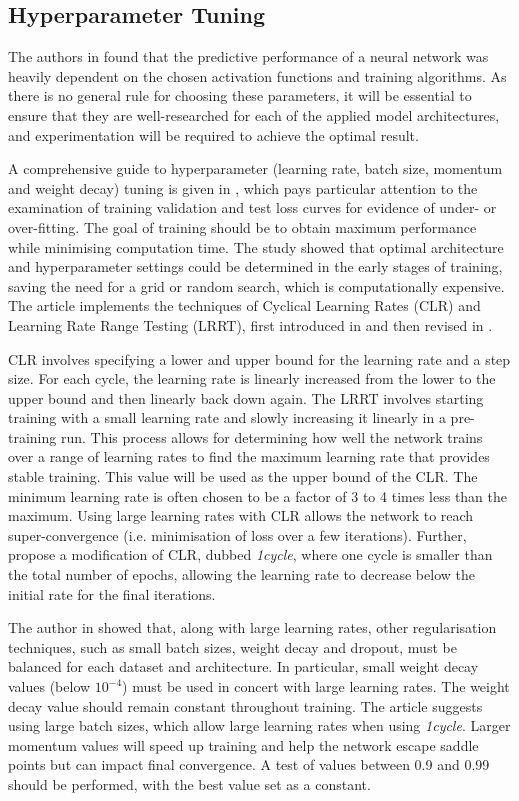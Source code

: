 \documentclass[mstat,12pt]{unswthesis}
\begin{document}
\subsection{Hyperparameter Tuning}
The authors in \cite{Raza2015} found that the predictive performance of a neural network was heavily dependent on the chosen activation functions and training algorithms. As there is no general rule for choosing these parameters, it will be essential to ensure that they are well-researched for each of the applied model architectures, and experimentation will be required to achieve the optimal result.

A comprehensive guide to hyperparameter (learning rate, batch size, momentum and weight decay) tuning is given in \cite{Smith2018}, which pays particular attention to the examination of training validation and test loss curves for evidence of under- or over-fitting. The goal of training should be to obtain maximum performance while minimising computation time. The study showed that optimal architecture and hyperparameter settings could be determined in the early stages of training, saving the need for a grid or random search, which is computationally expensive. The article implements the techniques of Cyclical Learning Rates (CLR) and Learning Rate Range Testing (LRRT), first introduced in \cite{Smith2015} and then revised in \cite{Smith2017}. 

CLR involves specifying a lower and upper bound for the learning rate and a step size. For each cycle, the learning rate is linearly increased from the lower to the upper bound and then linearly back down again. The LRRT involves starting training with a small learning rate and slowly increasing it linearly in a pre-training run. This process allows for determining how well the network trains over a range of learning rates to find the maximum learning rate that provides stable training. This value will be used as the upper bound of the CLR. The minimum learning rate is often chosen to be a factor of 3 to 4 times less than the maximum. Using large learning rates with CLR allows the network to reach super-convergence \cite{SmithTopin2019} (i.e. minimisation of loss over a few iterations). Further, \cite{Smith2017} propose a modification of CLR, dubbed \textit{1cycle}, where one cycle is smaller than the total number of epochs, allowing the learning rate to decrease below the initial rate for the final iterations.

The author in \cite{Smith2017} showed that, along with large learning rates, other regularisation techniques, such as small batch sizes, weight decay and dropout, must be balanced for each dataset and architecture. In particular, small weight decay values (below $10^{-4}$) must be used in concert with large learning rates. The weight decay value should remain constant throughout training. The article suggests using large batch sizes, which allow large learning rates when using \textit{1cycle}. Larger momentum values will speed up training and help the network escape saddle points but can impact final convergence. A test of values between 0.9 and 0.99 should be performed, with the best value set as a constant.
\end{document}
